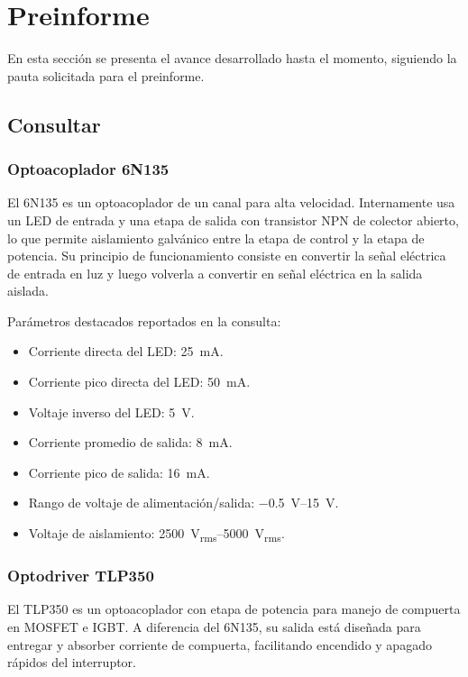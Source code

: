 \documentclass[12pt]{article}
\begin{document}
\newpage %

\section{Preinforme}
En esta sección se presenta el avance desarrollado hasta el momento, siguiendo la pauta solicitada para el preinforme.

\subsection{Consultar}

\subsubsection{Optoacoplador 6N135}
El 6N135 es un optoacoplador de un canal para alta velocidad. Internamente usa un LED de entrada y una etapa de salida con transistor NPN de colector abierto, lo que permite aislamiento galvánico entre la etapa de control y la etapa de potencia. Su principio de funcionamiento consiste en convertir la señal eléctrica de entrada en luz y luego volverla a convertir en señal eléctrica en la salida aislada.

Parámetros destacados reportados en la consulta:
\begin{itemize}
    \item Corriente directa del LED: \SI{25}{mA}.
    \item Corriente pico directa del LED: \SI{50}{mA}.
    \item Voltaje inverso del LED: \SI{5}{V}.
    \item Corriente promedio de salida: \SI{8}{mA}.
    \item Corriente pico de salida: \SI{16}{mA}.
    \item Rango de voltaje de alimentación/salida: \SIrange{-0.5}{15}{V}.
    \item Voltaje de aislamiento: \SIrange{2500}{5000}{V_{rms}}.
\end{itemize}

\subsubsection{Optodriver TLP350}
El TLP350 es un optoacoplador con etapa de potencia para manejo de compuerta en MOSFET e IGBT. A diferencia del 6N135, su salida está diseñada para entregar y absorber corriente de compuerta, facilitando encendido y apagado rápidos del interruptor.
\end{document}
